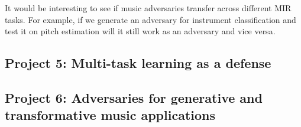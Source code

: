 \documentclass[journal,onecolumn]{IEEEtran}
\begin{document}
It would be interesting to see if music adversaries transfer across different MIR tasks. For example, if we generate an adversary for instrument classification and test it on pitch estimation will it still work as an adversary and vice versa. 
\subsection{Project 5: Multi-task learning as a defense}


\subsection{Project 6: Adversaries for generative and transformative music applications}



%
%

\end{document}
